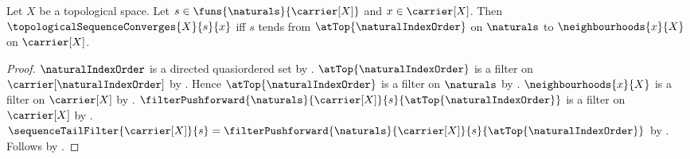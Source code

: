 \begin{theorem}\label{topological_sequence_convergence_iff_tendsto}
    Let $X$ be a topological space.
    Let $s\in\funs{\naturals}{\carrier[X]}$ and $x\in\carrier[X]$.
    Then $\topologicalSequenceConverges{X}{s}{x}$ iff
        $s$ tends from $\atTop{\naturalIndexOrder}$ on $\naturals$ to
            $\neighbourhoods{x}{X}$ on $\carrier[X]$.
\end{theorem}
\begin{proof}
    $\naturalIndexOrder$ is a directed quasiordered set by
        .
    $\atTop{\naturalIndexOrder}$ is a filter on
        $\carrier[\naturalIndexOrder]$ by .
    Hence $\atTop{\naturalIndexOrder}$ is a filter on $\naturals$ by
        .
    $\neighbourhoods{x}{X}$ is a filter on $\carrier[X]$ by
        .
    $\filterPushforward{\naturals}{\carrier[X]}{s}
        {\atTop{\naturalIndexOrder}}$ is a filter on $\carrier[X]$ by
        .
    $\sequenceTailFilter{\carrier[X]}{s}
        =\filterPushforward{\naturals}{\carrier[X]}{s}
            {\atTop{\naturalIndexOrder}}$ by
        .
    Follows by
        .
\end{proof}

